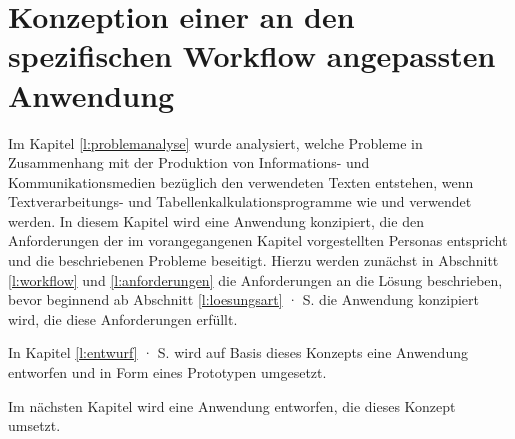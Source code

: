 \section{Konzeption einer an den spezifischen Workflow angepassten Anwendung}\label{l:konzeption}

Im Kapitel \ref{l:problemanalyse} wurde analysiert, welche Probleme in Zusammenhang mit der Produktion von Informations- und Kommunikationsmedien bezüglich den verwendeten Texten entstehen, wenn Textverarbeitungs- und Tabellenkalkulationsprogramme wie  und  verwendet werden. In diesem Kapitel wird eine Anwendung konzipiert, die den Anforderungen der im vorangegangenen Kapitel vorgestellten Personas entspricht und die beschriebenen Probleme beseitigt. Hierzu werden zunächst in Abschnitt \ref{l:workflow} und \ref{l:anforderungen} die Anforderungen an die Lösung beschrieben, bevor beginnend ab Abschnitt \ref{l:loesungsart} · S.\pageref{l:loesungsart} die Anwendung konzipiert wird, die diese Anforderungen erfüllt. 

\bigskip

In Kapitel \ref{l:entwurf} · S.\pageref{l:entwurf} wird auf Basis dieses Konzepts eine Anwendung entworfen und in Form eines Prototypen umgesetzt.









\bigskip

Im nächsten Kapitel wird eine Anwendung entworfen, die dieses Konzept umsetzt.

\pagebreak